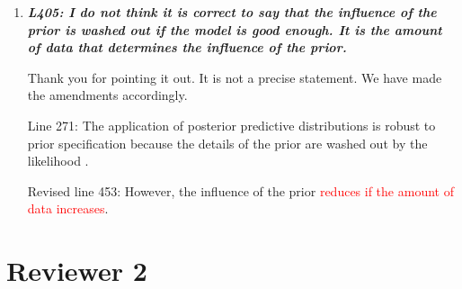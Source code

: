 \documentclass[a4paper]{article}   	%
\newcommand{\qtitle}[1]{\textit{\textbf{#1}}}
\begin{document}
\begin{enumerate}
    \item \qtitle{L405: I do not think it is correct to say that the influence of the prior is washed out if the model is good enough. It is the amount of data that determines the influence of the prior.}
    
    Thank you for pointing it out. It is not a precise statement. We have made the amendments accordingly. 
    
    Line 271: The application of posterior predictive distributions is robust to prior specification because the details of the prior are washed out by the likelihood \parencite{Gelman2017Prior}.
    
    Revised line 453: However, the influence of the prior \textcolor{red}{reduces if the amount of data increases}.    
    
\end{enumerate}





\section*{Reviewer 2}
\end{document}
